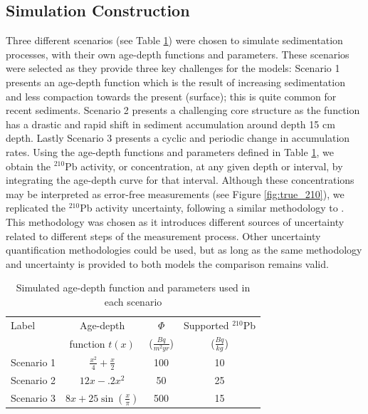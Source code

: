 \documentclass [10pt] {article}
\begin{document}
\subsection{Simulation Construction}\label{sec:SimConst}

Three different scenarios (see Table \ref{tab:sim_param}) were chosen to simulate sedimentation processes, with their own age-depth functions and parameters. 
These scenarios were selected as they provide three key challenges for the models: Scenario 1 presents an age-depth function which is the result of increasing sedimentation and less compaction towards the present (surface); this is quite common for recent sediments. Scenario 2 presents a challenging core structure as the function has a drastic and rapid shift in sediment accumulation around depth 15 cm depth. Lastly Scenario 3 presents a cyclic and periodic change in accumulation rates. 
Using the age-depth functions and parameters defined in Table \ref{tab:sim_param}, we obtain the $^{210}$Pb activity, or concentration, at any given depth or interval, by integrating the age-depth curve for that interval.  
Although these concentrations may be interpreted as error-free measurements 
(see Figure \ref{fig:true_210}), we replicated the $^{210}$Pb activity uncertainty, following a similar methodology to \citet{Blaauw2018}.
This methodology was chosen as it introduces different sources of uncertainty related to different steps of the measurement process.
Other uncertainty quantification methodologies could be used, but as long as the same methodology and uncertainty is provided to both models the comparison remains valid.
\begin{table}[!h]
	\centering
	\begin{tabular}{l|ccc}
Label    	& 	Age-depth		&	$ \Phi$		& Supported $^{210}$Pb  \\
		&	function $t(x)$		&	($\frac{Bq}{m^2yr }$)	& ($\frac{Bq}{kg}$) 	\\ \hline
Scenario 1 	&	$\frac{x^2}{4} + \frac{x}{2}$	&	100	& 10	\\
Scenario 2 	&	$12x -.2x^2$			&	50	& 25	\\
Scenario 3 	&	$8x+25\sin(\frac{x}{\pi})$	&	500 	& 15		
	\end{tabular}
	\label{tab:sim_param}
	\caption{Simulated age-depth function and parameters used in each scenario}
 \end{table}
\end{document}
